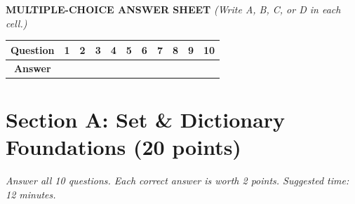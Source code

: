 \documentclass[11pt,a4paper]{article}
\begin{document}
\vspace{1mm}
\textbf{MULTIPLE-CHOICE ANSWER SHEET} \textit{(Write A, B, C, or D in each cell.)}
\begin{center}\setlength{\tabcolsep}{5pt}\renewcommand{\arraystretch}{1.1}
\begin{tabular}{|c|c|c|c|c|c|c|c|c|c|c|}\hline
\textbf{Question} & \textbf{1} & \textbf{2} & \textbf{3} & \textbf{4} & \textbf{5} & \textbf{6} & \textbf{7} & \textbf{8} & \textbf{9} & \textbf{10} \\ \hline
\textbf{Answer} & & & & & & & & & & \\[1.5mm] \hline
\end{tabular}\end{center}
\vspace{-2.5mm}
\section*{Section A: Set \& Dictionary Foundations \hfill \normalsize\normalfont(20 points)}
\textit{Answer all 10 questions. Each correct answer is worth 2 points. Suggested time: 12 minutes.}
\end{document}
